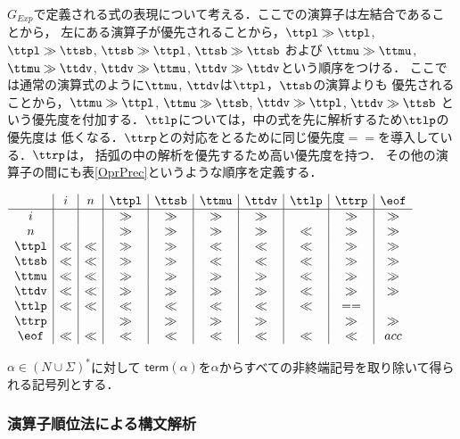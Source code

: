 \documentclass[a4j,dvipdfmx]{jbook}
\begin{document}
$G_{Exp}$で定義される式の表現について考える．ここでの演算子は左結合であることから，
左にある演算子が優先されることから，$\ttpl\gg\ttpl$, $\ttpl\gg\ttsb$,
$\ttsb\gg\ttpl$, $\ttsb\gg\ttsb$ および $\ttmu\gg\ttmu$, $\ttmu\gg\ttdv$,
$\ttdv\gg\ttmu$, $\ttdv\gg\ttdv$という順序をつける．
ここでは通常の演算式のように$\ttmu$, $\ttdv$は$\ttpl$，$\ttsb$の演算よりも
優先されることから，$\ttmu\gg\ttpl$, $\ttmu\gg\ttsb$, $\ttdv\gg\ttpl$, $\ttdv\gg\ttsb$
という優先度を付加する．$\ttlp$については，中の式を先に解析するため$\ttlp$の優先度は
低くなる．$\ttrp$との対応をとるために同じ優先度$==$を導入している．$\ttrp$は，
括弧の中の解析を優先するため高い優先度を持つ．
その他の演算子の間にも表\ref{OprPrec}というような順序を定義する．

\begin{table}
  \begin{center}
  $\begin{array}{c|c|c|c|c|c|c|c|c|c}
       & i & n & \ttpl & \ttsb & \ttmu & \ttdv & \ttlp & \ttrp & \eof\\\hline
    i  &   &   & \gg   & \gg   &  \gg  &  \gg  &       & \gg   & \gg\\
    n  &   &   & \gg   & \gg   &  \gg  &  \gg  &  \ll  & \gg   & \gg\\
  \ttpl&\ll&\ll& \gg   & \gg   &  \ll  &  \ll  &  \ll  & \gg   & \gg \\
  \ttsb&\ll&\ll& \gg   & \gg   &  \ll  &  \ll  &  \ll  & \gg   & \gg \\
  \ttmu&\ll&\ll&\gg   & \gg   &  \gg  &  \gg  &  \ll   & \gg   & \gg \\
  \ttdv&\ll&\ll&\gg   & \gg   &  \gg  &  \gg  &  \ll   & \gg   & \gg\\
  \ttlp&\ll&\ll&\ll   & \ll   &  \ll  &  \ll  &  \ll   & ==   & \\
  \ttrp&   &   & \gg  & \gg   &  \gg  & \gg   &        & \gg  & \gg \\
  \eof &\ll&\ll&\ll   & \ll   &  \ll  &  \ll  &  \ll   & \ll   & acc
  \end{array}$\end{center}
  \caption{演算子順位表}\label{OprPrec}
\end{table}

\begin{Def}
  $\alpha\in(N\cup\Sigma)^\ast$に対して
  $\mathsf{term}(\alpha)$を$\alpha$からすべての非終端記号を取り除いて得られる記号列とする．
\end{Def}

\subsubsection{演算子順位法による構文解析}
\end{document}
